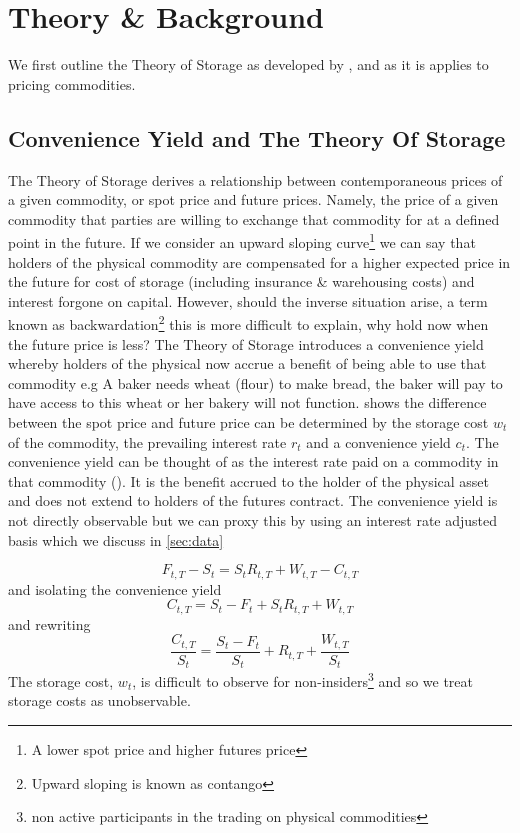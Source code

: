 \section{Theory \& Background}
\label{sec:theory}
We first outline the Theory of Storage as developed by \cite{kaldor1939}, \cite{workin1949} and \cite{brennan1958} as it is applies to pricing commodities.
\subsection{Convenience Yield and The Theory Of Storage}
The Theory of Storage derives a relationship between contemporaneous prices of a given commodity, or spot price and future prices. Namely, the price of a given commodity that parties are willing to exchange that commodity for at a defined point in the future. If we consider an upward sloping curve\footnote{A lower spot price and higher futures price} we can say that holders of the physical commodity are compensated for a higher expected price in the future for cost of storage (including insurance \& warehousing costs) and interest forgone on capital. However, should the inverse situation arise, a term known as backwardation\footnote{Upward sloping is known as contango} this is more difficult to explain, why hold now when the future price is less? The Theory of Storage introduces a convenience yield whereby holders of the physical now accrue a benefit of being able to use that commodity e.g A baker needs wheat (flour) to make bread, the baker will pay to have access to this wheat or her bakery will not function.  shows the difference between the spot price and future price can be determined by the storage cost $w_t$ of the commodity, the prevailing interest rate $r_t$ and a convenience yield $c_t$. The convenience yield can be thought of as the interest rate paid on a commodity in that commodity (\cite{convyieldoil}). It is the benefit accrued to the holder of the physical asset and does not extend to holders of the futures contract. The convenience yield is not directly observable but we can proxy this by using an interest rate adjusted basis which we discuss in \autoref{sec:data} 


\begin{equation}
 \label{eq:strg1}
 F_{t,T} - S_t = S_t R_{t, T} + W_{t, T} - C_{t, T}
\end{equation}
and isolating the convenience yield
\begin{equation}
\label{eq:strg2}
 C_{t, T} = S_t - F_t + S_t R_{t, T} + W_{t, T} 
\end{equation}
and rewriting 
\begin{equation}
 \frac{C_{t, T}}{S_t} = \frac{S_t - F_t}{S_t} + R_{t, T} + \frac{W_{t,T}}{S_t}
\end{equation}
The storage cost, $w_t$, is difficult to observe for non-insiders\footnote{non active participants in the trading on physical commodities} and so we treat storage costs as unobservable.
